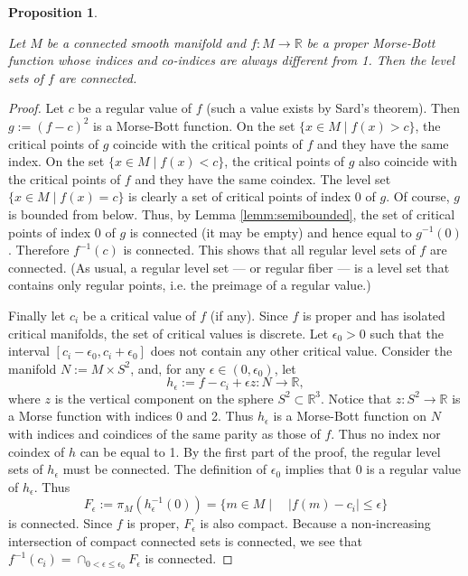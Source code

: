 \documentclass[11pt]{article}
\newtheorem{prop}[theorem]{Proposition}
\newcommand{\abs}[1]{\left|#1\right|}
\newcommand{\fleche}{\rightarrow}
\newcommand{\RM}{\mathbb{R}}
\renewcommand{\leq}{\leqslant}
\begin{document}
\begin{prop} \label{prop:levelset}

  Let $M$ be a connected smooth manifold and $f:M\fleche\RM$ be a
  proper Morse-Bott function whose indices and co-indices are always
  different from 1. Then the level sets of $f$ are connected.
\end{prop}


\begin{proof}
  Let $c$ be a regular value of $f$ (such a value exists by Sard's
  theorem). Then $g:=(f-c)^2$ is a Morse-Bott function.  On the set
  $\{x \in M \mid f(x)>c\}$, the critical points of $g$ coincide with
  the critical points of $f$ and they have the same index. On the set
  $\{x \in M \mid f(x)<c\}$, the critical points of $g$ also coincide
  with the critical points of $f$ and they have the same coindex. The
  level set $\{x \in M \mid f(x)=c\}$ is clearly a set of critical
  points of index 0 of $g$. Of course, $g$ is bounded from
  below. Thus, by Lemma \ref{lemm:semibounded}, the set of critical
  points of index 0 of $g$ is connected (it may be empty) and hence
  equal to $g^{-1}(0)$. Therefore $f^{-1}(c)$ is connected.  This
  shows that all regular level sets of $f$ are connected.  (As usual,
  a regular level set --- or regular fiber --- is a level set that
  contains only regular points, i.e. the preimage of a regular value.)

  Finally let $c_i$ be a critical value of $f$ (if any). Since $f$ is
  proper and has isolated critical manifolds, the set of critical
  values is discrete. Let $\epsilon_0>0$ such that the interval
  $[c_i-\epsilon_0,c_i+\epsilon_0]$ does not contain any other
  critical value.  Consider the manifold $N:=M\times S^2$, and, for
  any $\epsilon\in(0,\epsilon_0)$, let
  \[
  h_\epsilon:=f-c_i+\epsilon z:N\fleche\RM,
  \]
  where $z$ is the vertical component on the sphere
  $S^2\subset\RM^3$. Notice that $z:S^2\fleche\RM$ is a Morse function
  with indices 0 and 2. Thus $h_\epsilon$ is a Morse-Bott function on
  $N$ with indices and coindices of the same parity as those of
  $f$. Thus no index nor coindex of $h$ can be equal to 1. By the
  first part of the proof, the regular level sets of $h_\epsilon$ must
  be connected. The definition of $\epsilon_0$ implies that $0$ is a
  regular value of $h_\epsilon$. Thus
  \[
  F_\epsilon:=\pi_M(h_\epsilon^{-1}(0)) = \{m\in M\mid \quad
  \abs{f(m)-c_i}\leq \epsilon\}
  \]
  is connected.  Since $f$ is proper, $F_\epsilon$ is also
  compact. Because a non-increasing intersection of compact connected
  sets is connected, we see that
  $f^{-1}(c_i)=\cap_{0<\epsilon\leq\epsilon_0}F_\epsilon$ is
  connected.
\end{proof}
\end{document}
